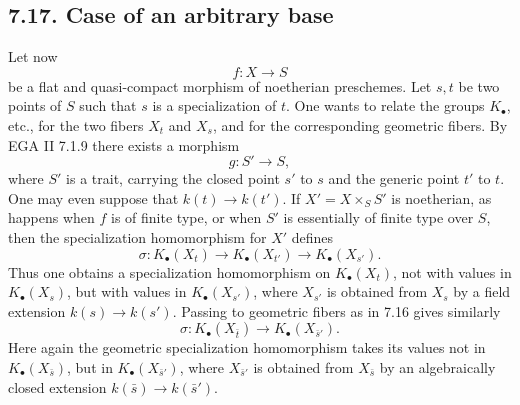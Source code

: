 \documentclass[11pt]{article}
\begin{document}
\subsection*{7.17. Case of an arbitrary base}
Let now
\[
  f:X\longrightarrow S
\]
be a flat and quasi-compact morphism of noetherian preschemes. Let \(s,t\) be two points of \(S\) such that \(s\) is a specialization of \(t\). One wants to relate the groups \(K_\bullet\), etc., for the two fibers \(X_t\) and \(X_s\), and for the corresponding geometric fibers. By EGA II 7.1.9 there exists a morphism
\[
  g:S'\longrightarrow S,
\]
where \(S'\) is a trait, carrying the closed point \(s'\) to \(s\) and the generic point \(t'\) to \(t\). One may even suppose that \(k(t)\to k(t')\). If \(X'=X\times_SS'\) is noetherian, as happens when \(f\) is of finite type, or when \(S'\) is essentially of finite type over \(S\), then the specialization homomorphism for \(X'\) defines
\begin{equation}\tag{7.17.1}
  \sigma:K_\bullet(X_t)\longrightarrow K_\bullet(X_{t'})
  \longrightarrow K_\bullet(X_{s'}).
\end{equation}
Thus one obtains a specialization homomorphism on \(K_\bullet(X_t)\), not with values in \(K_\bullet(X_s)\), but with values in \(K_\bullet(X_{s'})\), where \(X_{s'}\) is obtained from \(X_s\) by a field extension \(k(s)\to k(s')\). Passing to geometric fibers as in 7.16 gives similarly
\begin{equation}\tag{7.17.2}
  \sigma:K_\bullet(X_{\bar t})\longrightarrow K_\bullet(X_{\bar s'}).
\end{equation}
Here again the geometric specialization homomorphism takes its values not in \(K_\bullet(X_{\bar s})\), but in \(K_\bullet(X_{\bar s'})\), where \(X_{\bar s'}\) is obtained from \(X_{\bar s}\) by an algebraically closed extension \(k(\bar s)\to k(\bar s')\).
\end{document}
